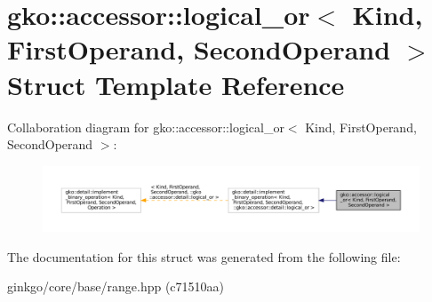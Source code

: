\hypertarget{structgko_1_1accessor_1_1logical__or}{}\section{gko\+:\+:accessor\+:\+:logical\+\_\+or$<$ Kind, First\+Operand, Second\+Operand $>$ Struct Template Reference}
\label{structgko_1_1accessor_1_1logical__or}


Collaboration diagram for gko\+:\+:accessor\+:\+:logical\+\_\+or$<$ Kind, First\+Operand, Second\+Operand $>$\+:
\nopagebreak
\begin{figure}[H]
\begin{center}
\leavevmode
\includegraphics[width=350pt]{structgko_1_1accessor_1_1logical__or__coll__graph}
\end{center}
\end{figure}


The documentation for this struct was generated from the following file\+:\begin{DoxyCompactItemize}
\item 
ginkgo/core/base/range.\+hpp (c71510aa)\end{DoxyCompactItemize}
